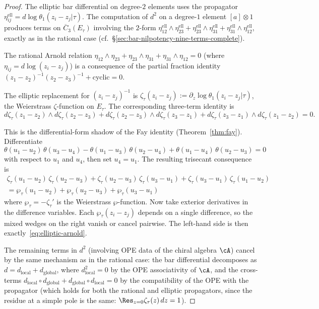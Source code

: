 \begin{proof}
The elliptic bar differential on degree-$2$ elements uses the
propagator $\eta_{ij}^{\mathrm{ell}} = d\log\theta_1(z_i - z_j
| \tau)$. The computation of $d^2$ on a degree-$1$ element
$[a] \otimes 1$ produces terms on $\overline{C}_3(E_\tau)$ involving
the $2$-form $\eta_{12}^{\mathrm{ell}} \wedge \eta_{23}^{\mathrm{ell}}
+ \eta_{23}^{\mathrm{ell}} \wedge \eta_{31}^{\mathrm{ell}}
+ \eta_{31}^{\mathrm{ell}} \wedge \eta_{12}^{\mathrm{ell}}$,
exactly as in the rational case (cf.\
\S\ref{sec:bar-nilpotency-nine-terms-complete}).

The rational Arnold relation $\eta_{12} \wedge \eta_{23}
+ \eta_{23} \wedge \eta_{31} + \eta_{31} \wedge \eta_{12} = 0$
(where $\eta_{ij} = d\log(z_i - z_j)$) is a consequence of
the partial fraction identity
$(z_1 - z_2)^{-1}(z_2 - z_3)^{-1} + \text{cyclic} = 0$.

The elliptic replacement for $(z_i-z_j)^{-1}$ is
$\zeta_\tau(z_i - z_j) := \partial_z \log\theta_1(z_i - z_j|\tau)$,
the Weierstrass $\zeta$-function on $E_\tau$. The corresponding
three-term identity is
\begin{equation}\label{eq:elliptic-arnold}
d\zeta_\tau(z_1{-}z_2) \wedge d\zeta_\tau(z_2{-}z_3)
+ d\zeta_\tau(z_2{-}z_3) \wedge d\zeta_\tau(z_3{-}z_1)
+ d\zeta_\tau(z_3{-}z_1) \wedge d\zeta_\tau(z_1{-}z_2) = 0.
\end{equation}

This is the differential-form shadow of the Fay identity
(Theorem~\ref{thm:fay}). Differentiate
\[
\theta(u_1{-}u_2)\,\theta(u_3{-}u_4) -
\theta(u_1{-}u_3)\,\theta(u_2{-}u_4) +
\theta(u_1{-}u_4)\,\theta(u_2{-}u_3) = 0
\]
with respect to $u_1$ and $u_4$, then set $u_4 = u_1$. The resulting
trisecant consequence is
\begin{multline*}
\zeta_\tau(u_1{-}u_2)\,\zeta_\tau(u_2{-}u_3)
+ \zeta_\tau(u_2{-}u_3)\,\zeta_\tau(u_3{-}u_1)
+ \zeta_\tau(u_3{-}u_1)\,\zeta_\tau(u_1{-}u_2) \\
= \wp_\tau(u_1{-}u_2) + \wp_\tau(u_2{-}u_3) + \wp_\tau(u_3{-}u_1)
\end{multline*}
where $\wp_\tau = -\zeta_\tau'$ is the Weierstrass $\wp$-function.
Now take exterior derivatives in the difference variables. Each
$\wp_\tau(z_i-z_j)$ depends on a single difference, so the mixed wedges
on the right vanish or cancel pairwise. The left-hand side is then
exactly~\eqref{eq:elliptic-arnold}.

The remaining terms in $d^2$ (involving OPE data of the chiral
algebra $\cA$) cancel by the same mechanism as in the rational case:
the bar differential decomposes as $d = d_{\mathrm{local}} +
d_{\mathrm{global}}$, where $d_{\mathrm{local}}^2 = 0$ by the OPE
associativity of $\cA$, and the cross-terms $d_{\mathrm{local}} \circ
d_{\mathrm{global}} + d_{\mathrm{global}} \circ d_{\mathrm{local}} = 0$
by the compatibility of the OPE with the propagator (which holds for
both the rational and elliptic propagators, since the residue at a
simple pole is the same: $\Res_{z=0} \zeta_\tau(z)\,dz = 1$).
\end{proof}


